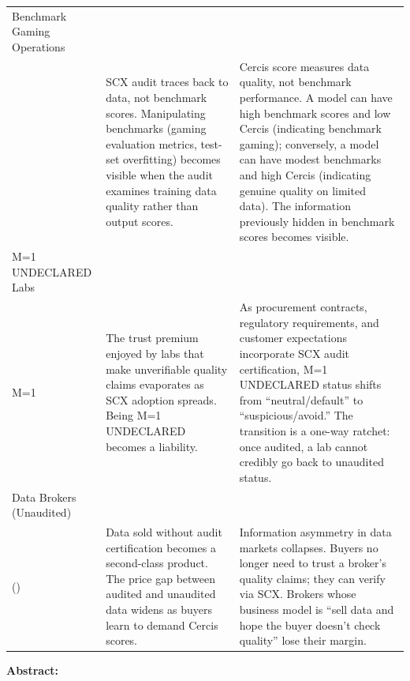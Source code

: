 \documentclass[12pt,a4paper]{article}
\theoremstyle{remark}
\begin{document}
\begin{longtable}{@{}p{3cm} p{5cm} p{6cm}@{}}
\addlinespace
Benchmark Gaming Operations\\ &
SCX audit traces back to data, not benchmark scores. Manipulating benchmarks 
(gaming evaluation metrics, test-set overfitting) becomes visible when the 
audit examines training data quality rather than output scores. &
Cercis score measures data quality, not benchmark performance. A model can 
have high benchmark scores and low Cercis (indicating benchmark gaming); 
conversely, a model can have modest benchmarks and high Cercis (indicating 
genuine quality on limited data). The information previously hidden in 
benchmark scores becomes visible. \\
\addlinespace
M=1 UNDECLARED Labs\\M=1 &
The trust premium enjoyed by labs that make unverifiable quality claims 
evaporates as SCX adoption spreads. Being M=1 UNDECLARED becomes a liability. &
As procurement contracts, regulatory requirements, and customer expectations 
incorporate SCX audit certification, M=1 UNDECLARED status shifts from 
``neutral/default'' to ``suspicious/avoid.'' The transition is a one-way 
ratchet: once audited, a lab cannot credibly go back to unaudited status. \\
\addlinespace
Data Brokers (Unaudited)\\() &
Data sold without audit certification becomes a second-class product. 
The price gap between audited and unaudited data widens as buyers learn 
to demand Cercis scores. &
Information asymmetry in data markets collapses. Buyers no longer need to 
trust a broker's quality claims; they can verify via SCX. Brokers whose 
business model is ``sell data and hope the buyer doesn't check quality'' 
lose their margin. \\
\bottomrule
\end{longtable}
\noindent\textbf{Abstract: }
\end{document}
